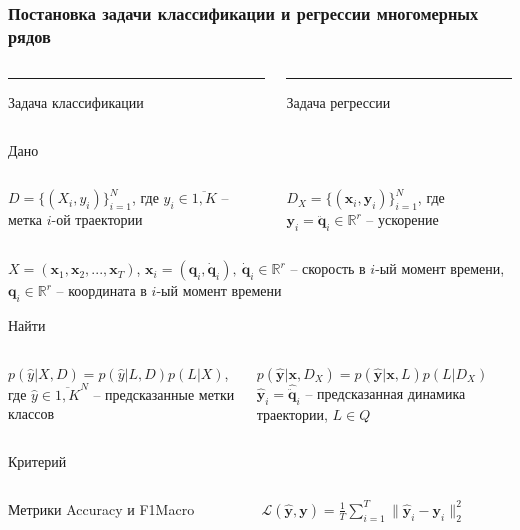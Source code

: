 \documentclass{beamer}
\begin{document}
\begin{frame}
\frametitle{Постановка задачи классификации и регрессии многомерных рядов}
\begin{columns}[T] %
\begin{column}{.48\textwidth}
\color{red}\rule{\linewidth}{4pt}

Задача классификации
\end{column}%
\hfill%
\begin{column}{.48\textwidth}
\color{blue}\rule{\linewidth}{4pt}

Задача регрессии
\end{column}%
\end{columns}
\begin{block}{Дано}
\begin{columns}[T] %
\begin{column}{.48\textwidth}
$D = \{(X_i, y_i)\}_{i=1}^N$, где $y_i \in \overline{1, K}$ -- метка $i$-ой траектории
\end{column}%
\hfill%
\begin{column}{.48\textwidth}
$D_X = \{(\mathbf{x}_i, \mathbf{y}_i)\}_{i=1}^N$, где $\mathbf{y}_i = \ddot{\mathbf{q}}_i \in \mathbb{R}^r$ -- ускорение
\end{column}%
\end{columns}
\hfill

$X = (\mathbf{x}_1, \mathbf{x}_2,..., \mathbf{x}_T)$, 
$\mathbf{x}_i = (\mathbf{q}_i, \mathbf{\dot{q}}_i),\ \mathbf{\dot{q}}_i \in \mathbb{R}^r$ -- скорость в $i$-ый момент времени, $\mathbf{q}_i \in \mathbb{R}^r$ -- координата в $i$-ый момент времени
\end{block}
\begin{block}{Найти}
\begin{columns}[T] %
\begin{column}{.48\textwidth}
$p(\hat{y}|X, D) = p(\hat{y}|L, D)p(L|X)$, где $\hat{y} \in \overline{1, K}^N$ -- предсказанные метки классов
\end{column}%
\hfill%
\begin{column}{.48\textwidth}
$p(\hat{\mathbf{y}}| \mathbf{x} , D_X)  = p(\hat{\mathbf{y}}| \mathbf{x}, L) p(L|D_X)$
$\hat{\mathbf{y}}_i = \hat{\ddot{\mathbf{q}}}_i$ -- предсказанная динамика траектории, $L \in Q$
\end{column}%
\end{columns}
\end{block}
\begin{block}{Критерий}
\begin{columns}[T] %
\begin{column}{.48\textwidth}
Метрики Accuracy и F1Macro 
\end{column}%
\hfill%
\begin{column}{.48\textwidth}

$\mathcal{L}(\hat{\mathbf{y}}, \mathbf{y})  = \frac{1}{T}\sum_{i=1}^{T} \| \mathbf{\hat{y}}_i - \mathbf{y}_i \|_2^2$
\end{column}%
\end{columns}
\end{block}
\end{frame}
\end{document}
